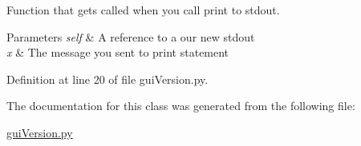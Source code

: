 Function that gets called when you call print to stdout. 


\begin{DoxyParams}{Parameters}
{\em self} & A reference to a our new stdout \\
\hline
{\em x} & The message you sent to print statement \\
\hline
\end{DoxyParams}


Definition at line 20 of file gui\+Version.\+py.



The documentation for this class was generated from the following file\+:\begin{DoxyCompactItemize}
\item 
\hyperlink{gui_version_8py}{gui\+Version.\+py}\end{DoxyCompactItemize}
